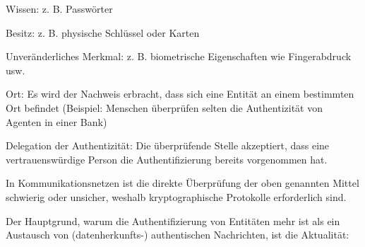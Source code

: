 \documentclass[a4paper]{article}
\begin{document}
\begin{multicols}{3}
\begin{itemize*}
            \begin{itemize*}
                  \item Wissen: z. B. Passwörter
                  \item Besitz: z. B. physische Schlüssel oder Karten
                  \item Unveränderliches Merkmal: z. B. biometrische Eigenschaften wie Fingerabdruck usw.
                  \item Ort: Es wird der Nachweis erbracht, dass sich eine Entität an einem bestimmten Ort befindet (Beispiel: Menschen überprüfen selten die Authentizität von Agenten in einer Bank)
                  \item Delegation der Authentizität: Die überprüfende Stelle akzeptiert, dass eine vertrauenswürdige Person die Authentifizierung bereits vorgenommen hat.
            \end{itemize*}
            \item
            In Kommunikationsnetzen ist die direkte Überprüfung der oben genannten
            Mittel schwierig oder unsicher, weshalb kryptographische Protokolle
            erforderlich sind.
            \item
            Der Hauptgrund, warum die Authentifizierung von Entitäten mehr ist als
            ein Austausch von (datenherkunfts-) authentischen Nachrichten, ist die
            Aktualität:


\end{itemize*}
\end{multicols}
\end{document}
